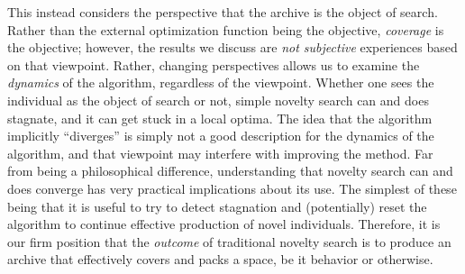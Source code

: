 \documentclass[twoside]{article}
\begin{document}
This instead considers the perspective that the archive is the object of search.  Rather than the external optimization function being the objective, \emph{coverage} is the objective; however, the results we discuss are \emph{not subjective} experiences based on that viewpoint.  Rather, changing perspectives allows us to examine the \emph{dynamics} of the algorithm, regardless of the viewpoint.  Whether one sees the individual as the object of search or not, simple novelty search can and does stagnate, and it can get stuck in a local optima.  The idea that the algorithm implicitly ``diverges'' \citep{Lehman2016frai,Lehman2015gecco,StanleyLehman2015} is simply not a good description for the dynamics of the algorithm, and that viewpoint may interfere with improving the method.  Far from being a philosophical difference, understanding that novelty search can and does converge has very practical implications about its use.  The simplest of these being that it is useful to try to detect stagnation and (potentially) reset the algorithm to continue effective production of novel individuals.  Therefore, it is our firm position that the \emph{outcome} of traditional novelty search is to produce an archive that effectively covers and packs a space, be it behavior or otherwise.

\small



\end{document}
